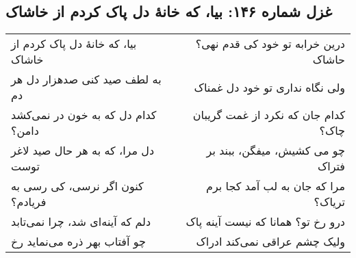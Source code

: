 \begin{center}
\section*{غزل شماره ۱۴۶: بیا، که خانهٔ دل پاک کردم از خاشاک}
\label{sec:146}
\begin{longtable}{l p{0.5cm} r}
بیا، که خانهٔ دل پاک کردم از خاشاک
&&
درین خرابه تو خود کی قدم نهی؟ حاشاک
\\
به لطف صید کنی صدهزار دل هر دم
&&
ولی نگاه نداری تو خود دل غمناک
\\
کدام دل که به خون در نمی‌کشد دامن؟
&&
کدام جان که نکرد از غمت گریبان چاک؟
\\
دل مرا، که به هر حال صید لاغر توست
&&
چو می کشیش، میفگن، ببند بر فتراک
\\
کنون اگر نرسی، کی رسی به فریادم؟
&&
مرا که جان به لب آمد کجا برم تریاک؟
\\
دلم که آینه‌ای شد، چرا نمی‌تابد
&&
درو رخ تو؟ همانا که نیست آینه پاک
\\
چو آفتاب بهر ذره می‌نماید رخ
&&
ولیک چشم عراقی نمی‌کند ادراک
\\
\end{longtable}
\end{center}
